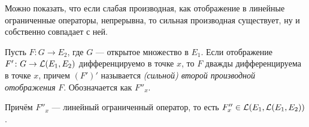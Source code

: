 \begin{note}
	Можно показать, что если слабая производная, как отображение в линейные ограниченные операторы, непрерывна, то сильная производная существует, ну и собственно совпадает с ней.
\end{note}

\begin{definition}
	Пусть $F \colon G \to E_2$, где $G$ --- открытое множество в $E_1$. Если отображение $F' \colon G \to \mathcal{L}(E_1, E_2)$ дифференцируемо в точке $x$, то $F$ дважды дифференцируема в точке  $x$, причем $(F')'$ называется \textit{(сильной) второй производной отображения} $F$. Обозначается как $F''_x$.
	
	Причём $F''_x$ --- линейный ограниченный оператор, то есть $F''_x \in \mathcal{L}(E_1, \mathcal{L}(E_1, E_2))$.
\end{definition}


